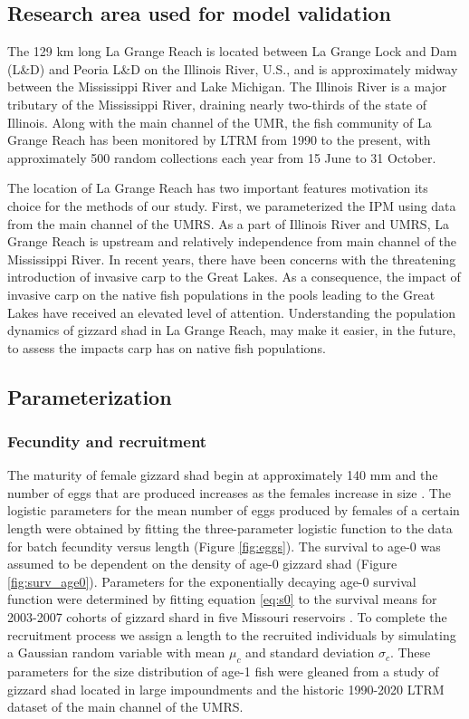 \documentclass[preprint,review,12pt,authoryear]{elsarticle}
\begin{document}
\subsection{Research area used for model validation}
The 129 km long La Grange Reach is located between La Grange Lock and Dam (L\&D) and Peoria L\&D on the Illinois River, U.S., and is approximately midway between the Mississippi River and Lake Michigan. 
The Illinois River is a major tributary of the Mississippi River, draining nearly two-thirds of the state of Illinois. 
Along with the main channel of the UMR, the fish community of La Grange Reach has been monitored by LTRM from 1990 to the present, with approximately 500 random collections each year from 15 June to 31 October. 

The location of La Grange Reach has two important features motivation its choice for the methods of our study. 
First, we parameterized the IPM using data from the main channel of the UMRS.  
As a part of Illinois River and UMRS, La Grange Reach is upstream and relatively independence from main channel of the Mississippi River.  
In recent years, there have been concerns with the threatening introduction of invasive carp to the Great Lakes.  
As a consequence, the impact of invasive carp on the native fish populations in the pools leading to the Great Lakes have received an elevated level of attention.  
Understanding the population dynamics of gizzard shad in La Grange Reach, may make it easier, in the future, to assess the impacts carp has on native fish populations.

\subsection{Parameterization}
\subsubsection{Fecundity and recruitment}
The maturity of female gizzard shad begin at approximately 140 mm and the number of eggs that are produced increases as the females increase in size \citep{jons1997ovarian}. 
The logistic parameters for the mean number of eggs produced by females of a certain length were obtained by fitting the three-parameter logistic function to the data for batch fecundity versus length \citep{jons1997ovarian} (Figure \ref{fig:eggs}). 
The survival to age-0 was assumed to be dependent on the density of age-0 gizzard shad (Figure \ref{fig:surv_age0}).  
Parameters for the exponentially decaying age-0 survival function were determined by fitting equation \ref{eq:s0} to the survival means for 2003-2007 cohorts of gizzard shard in five Missouri reservoirs \citep{michaletz2010overwinter}.
To complete the recruitment process we assign a length to the recruited individuals by simulating a Gaussian random variable with mean $\mu_c$ and standard deviation $\sigma_c$.
These parameters for the size distribution of age-1 fish were gleaned from a study of gizzard shad located in large impoundments \citep{michaletz2017variation} and the historic 1990-2020 LTRM dataset of the main channel of the UMRS.
\end{document}
